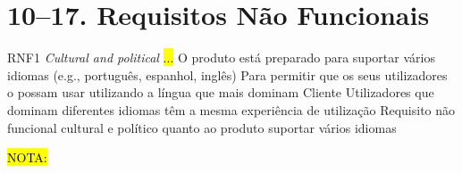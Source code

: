 \chapter*{10--17. Requisitos Não Funcionais}

\req
    {RNF1} %
    {\textit{Cultural and political}} %
    {\hl{...}} %
    {O produto está preparado para suportar vários idiomas (e.g., português, espanhol, inglês)} %
    {Para permitir que os seus utilizadores o possam usar utilizando a língua que mais dominam} %
    {Cliente} %
    {Utilizadores que dominam diferentes idiomas têm a mesma experiência de utilização} %
    {\prioShould} %
    {Requisito não funcional cultural e político quanto ao produto suportar vários idiomas} %


\hl{NOTA:} 

